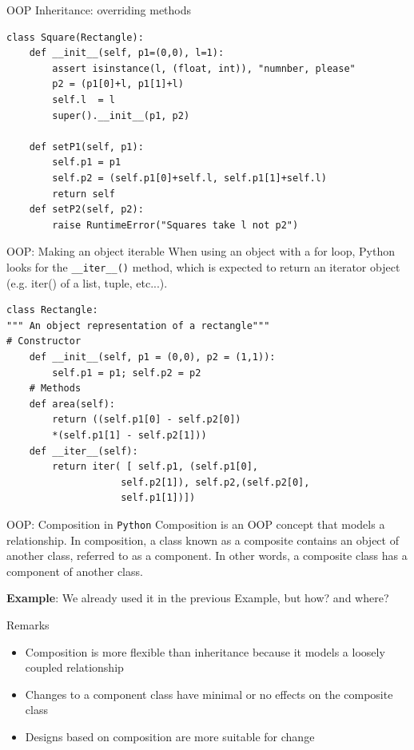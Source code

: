 \documentclass[10pt]{beamer}
\begin{document}
\begin{frame}[fragile]{OOP Inheritance: overriding methods}
\begin{lstlisting}[style=mypython]
class Square(Rectangle):
	def __init__(self, p1=(0,0), l=1):
		assert isinstance(l, (float, int)), "numnber, please"
		p2 = (p1[0]+l, p1[1]+l)
		self.l  = l
		super().__init__(p1, p2)

	def setP1(self, p1):
		self.p1 = p1
		self.p2 = (self.p1[0]+self.l, self.p1[1]+self.l)
		return self
	def setP2(self, p2):
		raise RuntimeError("Squares take l not p2")
\end{lstlisting}
\end{frame}

\begin{frame}[fragile]{OOP: Making an object iterable}
When using an object with a for loop, Python looks for the \texttt{\_\_iter\_\_()} method, which is expected to return an iterator object (e.g. iter() of a list, tuple, etc...).
\begin{lstlisting}[style=mypython]
class Rectangle:
""" An object representation of a rectangle"""
# Constructor
	def __init__(self, p1 = (0,0), p2 = (1,1)):
		self.p1 = p1; self.p2 = p2
	# Methods
	def area(self):
		return ((self.p1[0] - self.p2[0]) 
		*(self.p1[1] - self.p2[1]))
	def __iter__(self):
		return iter( [ self.p1, (self.p1[0],
					self.p2[1]), self.p2,(self.p2[0],
					self.p1[1])])
\end{lstlisting}
\end{frame}


\begin{frame}[fragile]{OOP: Composition in \texttt{Python}}
Composition is an OOP concept that models a relationship. In composition, a class known as a composite contains an object of another class, referred to as a component. In other words, a composite class has a component of another class.

\textbf{Example}: We already used it in the previous Example, but how? and where?

\begin{block}{Remarks}
\begin{itemize}
	\item Composition is more flexible than inheritance because it models a loosely coupled relationship
	\item Changes to a component class have minimal or no effects on the composite class
	\item Designs based on composition are more suitable for change
\end{itemize}
\end{block}
\end{frame}
\end{document}
